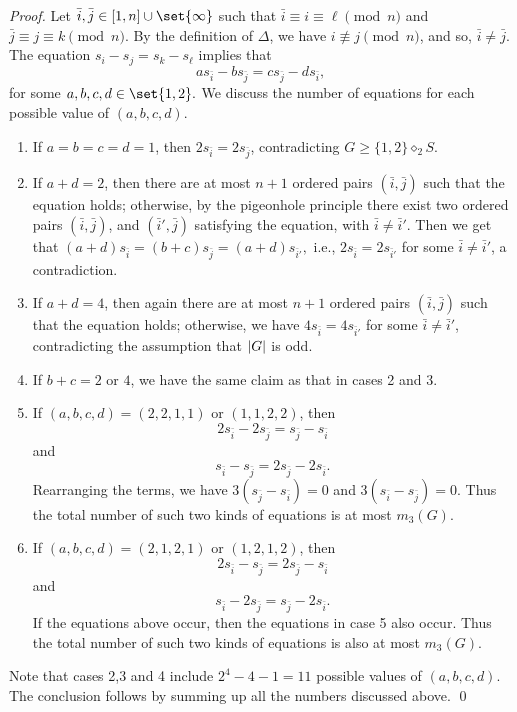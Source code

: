 \documentclass[sort&compress]{elsarticle}
\DeclarePairedDelimiter\abs{\lvert}{\rvert}
\newcommand{\bai}{\bar{i}}
\newcommand{\baj}{\bar{j}}
\renewcommand{\geq}{\geqslant}
\newcommand{\splt}{\diamond}
\begin{document}
  \begin{proof}
    Let $\bai,\baj\in[1,n]\cup\set{\infty}$ such that $\bai\equiv
    i\equiv \ell \pmod{n}$ and $\baj\equiv j \equiv k \pmod{n}$.  By the definition of $\Delta$, we have $i\not \equiv j \pmod{n}$, and so, $\bai\neq \baj$.
    The equation $s_i-s_j=s_k-s_\ell$ implies that
    \[as_{\bai}-bs_{\baj}=cs_{\baj}-ds_{\bai},\]
    for some $a,b,c,d\in \set{1,2}.$ We discuss the number of
    equations for each possible value of $(a,b,c,d)$.

    \begin{enumerate}
    \item
      If $a=b=c=d=1$, then $2s_{\bai}=2s_{\baj}$, contradicting $G
      \geq \{1,2\} \splt_2 S$.
    \item
      If $a+d=2$, then there are at most $n+1$ ordered pairs
      $(\bai,\baj)$ such that the equation holds; otherwise, by the
      pigeonhole principle there exist two ordered pairs
      $(\bai,\baj)$, and $(\bai',\baj)$ satisfying the equation, with
      $\bai\neq\bai'$. Then we get that
      $(a+d)s_{\bai}=(b+c)s_{\baj}=(a+d)s_{\bai'},$ i.e., $2s_{\bai}
      =2s_{\bai'}$ for some $\bai\not =\bai'$, a contradiction.
    \item
      If $a+d=4$, then again there are at most $n+1$ ordered pairs
      $(\bai,\baj)$ such that the equation holds; otherwise, we have
      $4s_{\bai} =4s_{\bai'}$ for some $\bai\not =\bai'$,
      contradicting the assumption that $\abs{G}$ is odd.
    \item
      If $b+c=2$ or $4$, we have the same claim as that in cases 2 and 3.
    \item
      If $(a,b,c,d)=(2,2,1,1)$ or $(1,1,2,2)$, then  
      \[2s_{\bai}-2s_{\baj}=s_{\baj}-s_{\bai}\]
      and 
      \[s_{\bai}-s_{\baj}=2s_{\baj}-2s_{\bai}.\]
      Rearranging the terms, we have $3(s_{\baj}-s_{\bai})=0$ and
      $3(s_{\bai}-s_{\baj})=0$. Thus the total number of such two
      kinds of equations is at most $m_3(G)$.
    \item  If $(a,b,c,d)=(2,1,2,1)$ or $(1,2,1,2)$, then 
      \[2s_{\bai}-s_{\baj}=2s_{\baj}-s_{\bai}\]
      and 
      \[s_{\bai}-2s_{\baj}=s_{\baj}-2s_{\bai}.\]
      If the equations above occur, then the equations in case 5 also
      occur. Thus the total number of such two kinds of equations is
      also at most $m_3(G)$.
    \end{enumerate}
    Note that cases 2,3 and 4 include $2^4-4-1=11$ possible values of
    $(a,b,c,d)$. The conclusion follows by summing up all the numbers
    discussed above.  \qed\end{proof}
\end{document}
